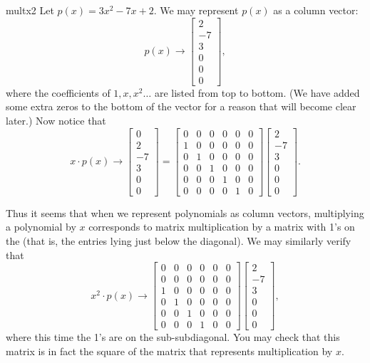 \begin{example}{multx2}
Let $p(x) = 3x^2 - 7x + 2$.  We may represent $p(x)$  as a column vector:
\[
p(x) \rightarrow  \left[\begin{array}{c}2\\-7\\3\\0\\0\\0\end{array}\right],
\]
where the coefficients of $1,x,x^2 \ldots$ are listed from top to bottom. (We have added some extra zeros to 
the bottom of the vector for a reason that will become clear later.) Now notice that 
\[
x \cdot p(x) \rightarrow \left[\begin{array}{c}0\\2\\-7\\3\\0\\0\end{array}\right] =
\left[\begin{array}{cccccc}0 & 0 & 0 & 0 & 0& 0\\1 & 0 & 0 & 0 & 0& 0\\0 & 1 & 0 & 0 & 0& 0\\0 & 0 & 1 & 0 & 0& 0\\0 & 0 & 0 & 1 & 0& 0\\0 & 0 & 0 & 0 & 1& 0\end{array}\right] \left[\begin{array}{c}2\\-7\\3\\0\\0\\0\end{array}\right]. \]

Thus  it seems that when we represent polynomials as column vectors, multiplying a polynomial by  $x$ corresponds to matrix multiplication by a matrix with 1's on the  (that is, the entries lying just below the diagonal). We may similarly verify that 
\[
x^2 \cdot p(x) \rightarrow  \left[\begin{array}{cccccc}0 & 0 & 0 & 0 & 0& 0\\0 & 0 & 0 & 0 & 0& 0\\1 & 0 & 0 & 0 & 0& 0\\0 & 1 & 0 & 0 & 0& 0\\0 & 0 & 1 & 0 & 0& 0\\0 & 0 & 0 & 1 & 0& 0\end{array}\right]   \left[\begin{array}{c}2\\-7\\3\\0\\0\\0\end{array}\right], \]
where this time the 1's are on the sub-subdiagonal.  You may check that this matrix is in fact the square of the matrix that represents multiplication by $x$.
\end{example}

